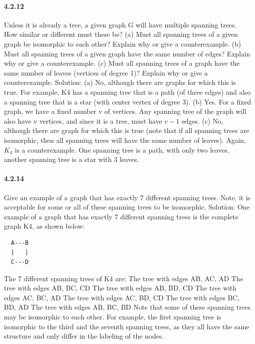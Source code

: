 \documentclass{article}
\begin{document}
\paragraph{4.2.12}
Unless it is already a tree, a given graph G will have multiple spanning
trees. How similar or different must these be?\newline
(a) Must all spanning trees of a given graph be isomorphic to each
other? Explain why or give a counterexample.\newline
(b) Must all spanning trees of a given graph have the same number
of edges? Explain why or give a counterexample.\newline
(c) Must all spanning trees of a graph have the same number of leaves
(vertices of degree 1)? Explain why or give a counterexample.\newline
Solution:\newline
(a) No, although there are graphs for which this is true. For example, K4
has a spanning tree that is a path (of three edges) and also a spanning
tree that is a star (with center vertex of degree 3).\newline
(b) Yes. For a fixed graph, we have a fixed number v of vertices. Any
spanning tree of the graph will also have v vertices, and since it is a
tree, must have $v - 1$ edges.\newline
(c) No, although there are graph for which this is true (note that if all
spanning trees are isomorphic, then all spanning trees will have
the same number of leaves). Again, $K_4$ is a counterexample. One
spanning tree is a path, with only two leaves, another spanning tree
is a star with 3 leaves.
\paragraph{4.2.14}
Give an example of a graph that has exactly 7 different spanning trees. Note, it is acceptable for some or all of these spanning trees to be isomorphic.\newline
Solution:\newline
One example of a graph that has exactly 7 different spanning trees is the complete graph K4, as shown below:
\begin{lstlisting}
  A---B
  |   |
  C---D
\end{lstlisting}
The 7 different spanning trees of K4 are:\newline
The tree with edges AB, AC, AD\newline
The tree with edges AB, BC, CD\newline
The tree with edges AB, BD, CD\newline
The tree with edges AC, BC, AD\newline
The tree with edges AC, BD, CD\newline
The tree with edges BC, BD, AD\newline
The tree with edges AB, BC, BD\newline
Note that some of these spanning trees may be isomorphic to each other. For example, the first spanning tree is isomorphic to the third and the seventh spanning trees, as they all have the same structure and only differ in the labeling of the nodes.
\end{document}
